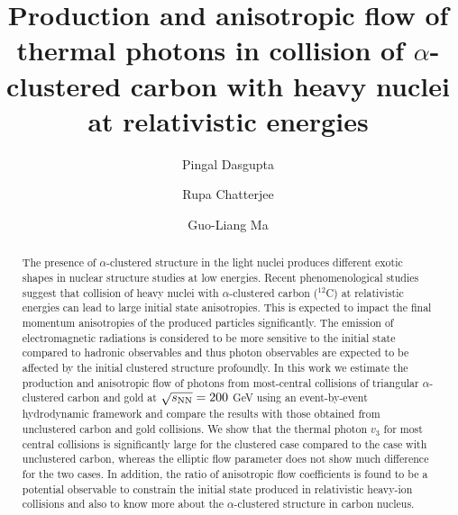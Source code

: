 \documentclass[aps,prc,twocolumn,floatfix,12pts,superscriptaddress]{revtex4}
\begin{document}
\title{Production and anisotropic flow of thermal photons in collision of $\alpha$-clustered carbon with heavy nuclei at relativistic energies}
\author{Pingal Dasgupta}
\author{Rupa Chatterjee}
\author{Guo-Liang Ma}




\begin{abstract}
The presence of $\alpha$-clustered structure in the light nuclei produces different exotic shapes in nuclear structure studies at low energies.  Recent phenomenological studies suggest that collision of heavy nuclei with $\alpha$-clustered carbon ($^{12}$C) at relativistic energies can lead to large initial state anisotropies. This is expected to impact the final momentum anisotropies of the produced particles significantly. The emission of electromagnetic radiations is considered to be more sensitive to the initial state compared to hadronic observables and thus photon observables are expected to be affected by the initial clustered structure profoundly.  In this work we estimate the production and anisotropic flow of photons from most-central collisions of triangular $\alpha$-clustered carbon and gold at $\sqrt{s_{\rm NN}}=200$ GeV using an event-by-event hydrodynamic framework and compare the results with those obtained from unclustered carbon and gold collisions. We show that the thermal photon $v_3$ for most central collisions is significantly large for the clustered case compared to the case with unclustered carbon, whereas the elliptic flow parameter does not show much difference for the two cases. In addition, the ratio of anisotropic flow coefficients is found to be a potential observable to constrain the initial state produced in relativistic heavy-ion collisions and also to know more about the $\alpha$-clustered structure in carbon nucleus. 


\end{abstract}
\end{document}
